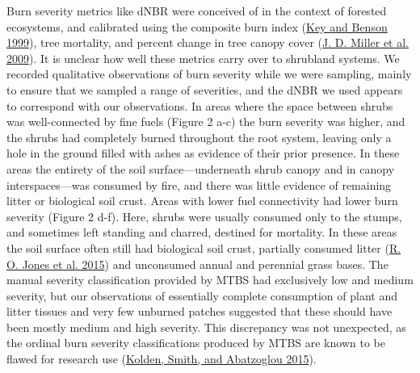 \documentclass[
  12pt,
]{article}
\begin{document}
Burn severity metrics like dNBR were conceived of in the context of
forested ecosystems, and calibrated using the composite burn index
(\protect\hyperlink{ref-Key1999}{Key and Benson 1999}), tree mortality,
and percent change in tree canopy cover
(\protect\hyperlink{ref-Miller2009}{J. D. Miller et al. 2009}). It is
unclear how well these metrics carry over to shrubland systems. We
recorded qualitative observations of burn severity while we were
sampling, mainly to ensure that we sampled a range of severities, and
the dNBR we used appears to correspond with our observations. In areas
where the space between shrubs was well-connected by fine fuels (Figure
2 a-c) the burn severity was higher, and the shrubs had completely
burned throughout the root system, leaving only a hole in the ground
filled with ashes as evidence of their prior presence. In these areas
the entirety of the soil surface---underneath shrub canopy and in canopy
interspaces---was consumed by fire, and there was little evidence of
remaining litter or biological soil crust. Areas with lower fuel
connectivity had lower burn severity (Figure 2 d-f). Here, shrubs were
usually consumed only to the stumps, and sometimes left standing and
charred, destined for mortality. In these areas the soil surface often
still had biological soil crust, partially consumed litter
(\protect\hyperlink{ref-Jones2015}{R. O. Jones et al. 2015}) and
unconsumed annual and perennial grass bases. The manual severity
classification provided by MTBS had exclusively low and medium severity,
but our observations of essentially complete consumption of plant and
litter tissues and very few unburned patches suggested that these should
have been mostly medium and high severity. This discrepancy was not
unexpected, as the ordinal burn severity classifications produced by
MTBS are known to be flawed for research use
(\protect\hyperlink{ref-Kolden2015}{Kolden, Smith, and Abatzoglou
2015}).
\end{document}

